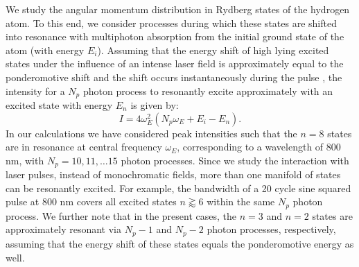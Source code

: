 We study the angular momentum distribution in Rydberg states of the hydrogen atom. To this end, we consider processes during which these states are shifted into resonance with multiphoton absorption from the initial ground state of the atom (with energy $E_i$). Assuming that the energy shift of high lying excited states under the influence of an intense laser field is approximately equal to the ponderomotive shift \cite{agostini1989} and the shift occurs instantaneously during the pulse \cite{he2011}, the intensity for a $N_p$ photon process to resonantly excite  approximately with an excited state with energy $E_n$ is given by:
%
\begin{equation}
I = 4\omega_E^2(N_p\omega_E + E_i - E_n).
\end{equation}
%
In our calculations we have considered peak intensities such that the $n=8$ states are in resonance at central frequency $\omega_E$, corresponding to a wavelength of 800 nm, with $N_p = 10, 11, \ldots 15$ photon processes. Since we study the interaction with laser pulses, instead of monochromatic fields, more than one manifold of states can be resonantly excited. For example, the bandwidth of a 20 cycle sine squared pulse at 800 nm covers all excited states $n \gtrapprox 6$ within the same $N_p$ photon process. We further note that in the present cases, the $n=3$ and $n=2$ states are approximately resonant via $N_p-1$ and $N_p-2$ photon processes, respectively, assuming that the energy shift of these states equals the ponderomotive energy as well.

